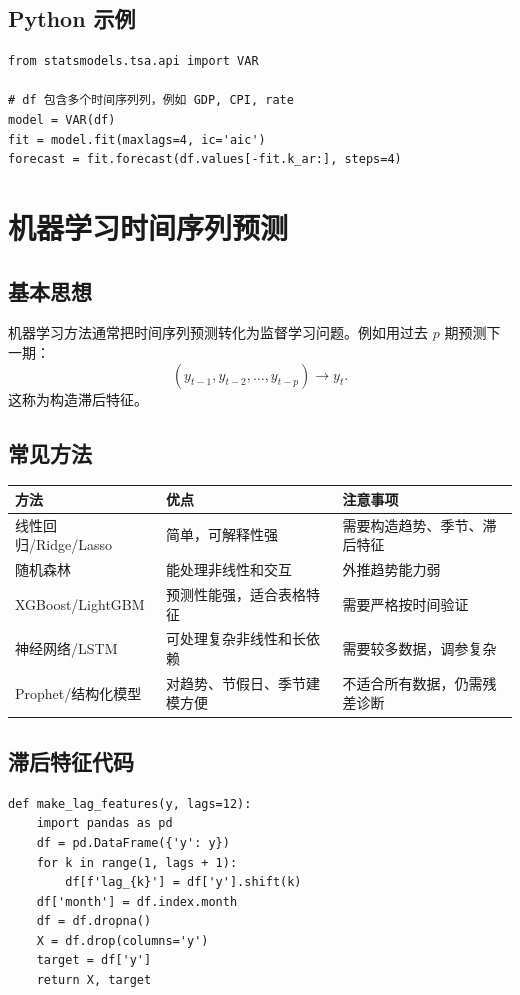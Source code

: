 \documentclass[11pt,a4paper]{ctexart}
\begin{document}
\subsection{Python 示例}
\begin{lstlisting}
from statsmodels.tsa.api import VAR

# df 包含多个时间序列列，例如 GDP, CPI, rate
model = VAR(df)
fit = model.fit(maxlags=4, ic='aic')
forecast = fit.forecast(df.values[-fit.k_ar:], steps=4)
\end{lstlisting}

\section{机器学习时间序列预测}
\subsection{基本思想}
机器学习方法通常把时间序列预测转化为监督学习问题。例如用过去 $p$ 期预测下一期：
\[
(y_{t-1},y_{t-2},\ldots,y_{t-p})\longrightarrow y_t.
\]
这称为构造滞后特征。

\subsection{常见方法}
\begin{longtable}{p{3.2cm}p{5.1cm}p{5.1cm}}
\toprule
方法 & 优点 & 注意事项 \\
\midrule
线性回归/Ridge/Lasso & 简单，可解释性强 & 需要构造趋势、季节、滞后特征 \\
随机森林 & 能处理非线性和交互 & 外推趋势能力弱 \\
XGBoost/LightGBM & 预测性能强，适合表格特征 & 需要严格按时间验证 \\
神经网络/LSTM & 可处理复杂非线性和长依赖 & 需要较多数据，调参复杂 \\
Prophet/结构化模型 & 对趋势、节假日、季节建模方便 & 不适合所有数据，仍需残差诊断 \\
\bottomrule
\end{longtable}

\subsection{滞后特征代码}
\begin{lstlisting}
def make_lag_features(y, lags=12):
    import pandas as pd
    df = pd.DataFrame({'y': y})
    for k in range(1, lags + 1):
        df[f'lag_{k}'] = df['y'].shift(k)
    df['month'] = df.index.month
    df = df.dropna()
    X = df.drop(columns='y')
    target = df['y']
    return X, target
\end{lstlisting}
\end{document}
